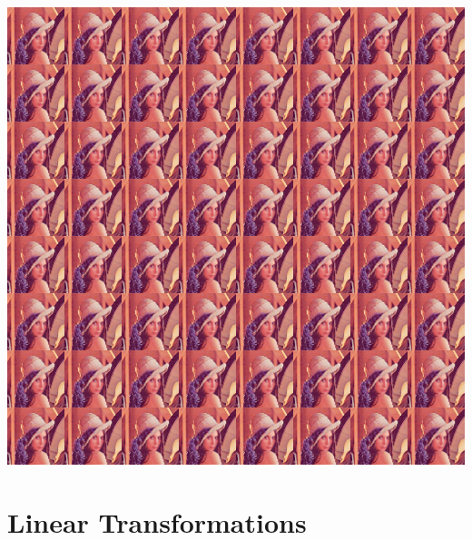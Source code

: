 \documentclass{book}
\begin{document}
\begin{exercise}
\begin{center}
\includegraphics[scale=0.2]{lena-tiled-64.png}
\end{center} 
\end{exercise}


\section{Linear Transformations}



\end{document}
